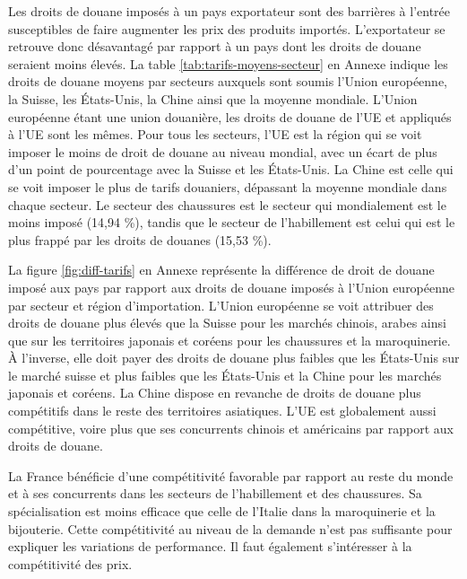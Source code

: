 \documentclass[french,10pt,a4paper]{article}
\begin{document}
\bigskip


\begin{tcolorbox}[title=Encadré 1 : Droits de douane]
  \small
  Les droits de douane imposés à un pays exportateur sont des barrières à l'entrée susceptibles de faire augmenter les prix des produits importés. L'exportateur se retrouve donc désavantagé par rapport à un pays dont les droits de douane seraient moins élevés. La table \ref{tab:tarifs-moyens-secteur} en Annexe indique les droits de douane moyens par secteurs auxquels sont soumis l'Union européenne, la Suisse, les États-Unis, la Chine ainsi que la moyenne mondiale. L'Union européenne étant une union douanière, les droits de douane de l'UE et appliqués à l'UE sont les mêmes. Pour tous les secteurs, l'UE est la région qui se voit imposer le moins de droit de douane au niveau mondial, avec un écart de plus d'un point de pourcentage avec la Suisse et les États-Unis. La Chine est celle qui se voit imposer le plus de tarifs douaniers, dépassant la moyenne mondiale dans chaque secteur. Le secteur des chaussures est le secteur qui mondialement est le moins imposé (14,94 \%), tandis que le secteur de l'habillement est celui qui est le plus frappé par les droits de douanes (15,53 \%).
  

  \medskip
  
  La figure \ref{fig:diff-tarifs} en Annexe représente la différence de droit de douane imposé aux pays par rapport aux droits de douane imposés à l'Union européenne par secteur et région d'importation. L'Union européenne se voit attribuer des droits de douane plus élevés que la Suisse pour les marchés chinois, arabes ainsi que sur les territoires japonais et coréens pour les chaussures et la maroquinerie. À l'inverse, elle doit payer des droits de douane plus faibles que les États-Unis sur le marché suisse et plus faibles que les États-Unis et la Chine pour les marchés japonais et coréens. La Chine dispose en revanche de droits de douane plus compétitifs dans le reste des territoires asiatiques. L'UE est globalement aussi compétitive, voire plus que ses concurrents chinois et américains par rapport aux droits de douane.
  

\end{tcolorbox}

\bigskip

La France bénéficie d'une compétitivité favorable par rapport au reste du monde et à ses concurrents dans les secteurs de l'habillement et des chaussures. Sa spécialisation est moins efficace que celle de l'Italie dans la maroquinerie et la bijouterie. Cette compétitivité au niveau de la demande n'est pas suffisante pour expliquer les variations de performance. Il faut également s'intéresser à la compétitivité des prix.
\end{document}
